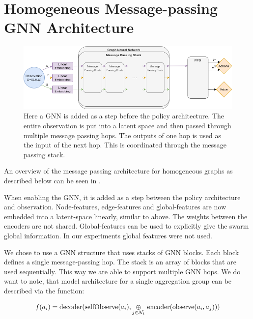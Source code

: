 \section{Homogeneous Message-passing GNN Architecture}
\begin{figure}[htp]
    \centering
    \includegraphics[width=1.0\textwidth]{figures/homogeneous_gnn.png}
    \hspace{1cm}   
    \caption{Here a GNN is added as a step before the policy architecture. The entire observation is put into a latent space and then passed through multiple message passing hops. The outputs of one hop is used as the input of the next hop. This is coordinated through the message passing stack.}
    \label{fig:homogeneous_gnn}
\end{figure}

An overview of the message passing architecture for homogeneous graphs as described below can be seen in .

When enabling the GNN, it is added as a step between the policy architecture and observation. Node-features, edge-features and global-features are now embedded into a latent-space linearly, similar to above. The weights between the encoders are not shared. Global-features can be used to explicitly give the swarm global information. In our experiments global features were not used. \par

We chose to use a GNN structure that uses stacks of GNN blocks. Each block defines a single message-passing hop. The stack is an array of blocks that are used sequentially. This way we are able to support multiple GNN hops. We do want to note, that  model architecture for a single aggregation group can be described via the function:

\begin{equation}
    f(a_i) = \textup{decoder(selfObserve}(a_i), \underset{j \in \mathcal{N}_i}{\oplus}\ \textup{encoder}(\textup{observe}(a_i, a_j))) \nonumber
\end{equation}

